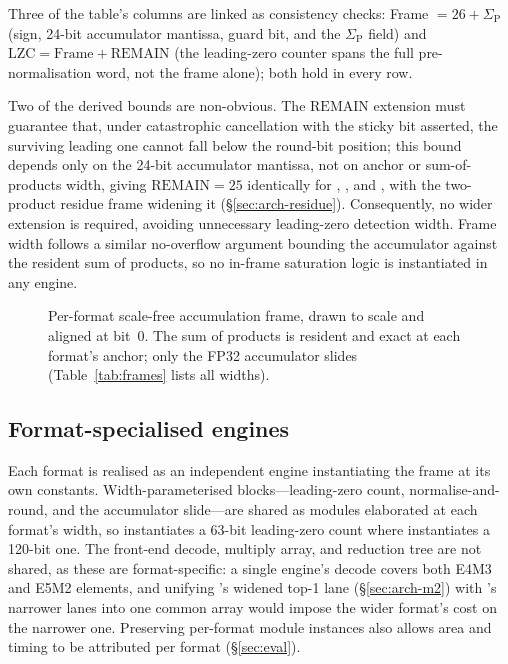 

Three of the table's columns are linked as consistency checks: Frame $=
26+\Sigma_{\mathrm{P}}$ (sign, 24-bit accumulator mantissa, guard bit, and the
$\Sigma_{\mathrm{P}}$ field) and $\text{LZC}=\text{Frame}+\mathrm{REMAIN}$
(the leading-zero counter spans the full pre-normalisation word, not the frame
alone); both hold in every row.

Two of the derived bounds are non-obvious. The $\mathrm{REMAIN}$ extension must
guarantee that, under catastrophic cancellation with the sticky bit asserted,
the surviving leading one cannot fall below the round-bit position; this bound
depends only on the 24-bit accumulator mantissa, not on anchor or
sum-of-products width, giving $\mathrm{REMAIN}=25$ identically for \fpfour,
\fpeight, and \mtwo, with the two-product residue frame widening it
(\S\ref{sec:arch-residue}). Consequently, no wider extension is required,
avoiding unnecessary leading-zero detection width. Frame width follows a
similar no-overflow argument bounding the accumulator against the resident sum
of products, so no in-frame saturation logic is instantiated in any engine.

\begin{figure}[t]
  \centering
  \resizebox{\columnwidth}{!}{}
\caption{Per-format scale-free accumulation frame, drawn to scale and aligned
  at bit~0. The sum of products is resident and exact at each format's anchor;
  only the FP32 accumulator slides (Table~\ref{tab:frames} lists all widths).}
  \label{fig:frame}
\end{figure}

\subsection{Format-specialised engines}
\label{sec:arch-engines}

Each format is realised as an independent engine instantiating the frame at its
own constants. Width-parameterised blocks---leading-zero count,
normalise-and-round, and the accumulator slide---are shared as modules
elaborated at each format's width, so \fpfour{} instantiates a 63-bit
leading-zero count where \fpeight{} instantiates a 120-bit one. The front-end
decode, multiply array, and reduction tree are not shared, as these are
format-specific: a single \fpeight{} engine's decode covers both E4M3 and E5M2
elements, and unifying \mtwo's widened top-1 lane (\S\ref{sec:arch-m2}) with
\fpfour's narrower lanes into one common array would impose the wider format's
cost on the narrower one. Preserving per-format module instances also allows
area and timing to be attributed per format
(\S\ref{sec:eval}).

